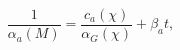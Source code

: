 \begin{equation}  \frac{1}{\alpha_a(M)} =
\frac{c_a(\chi)}{\alpha_G(\chi)} + \beta_a t, \label{rge1} \end{equation}

